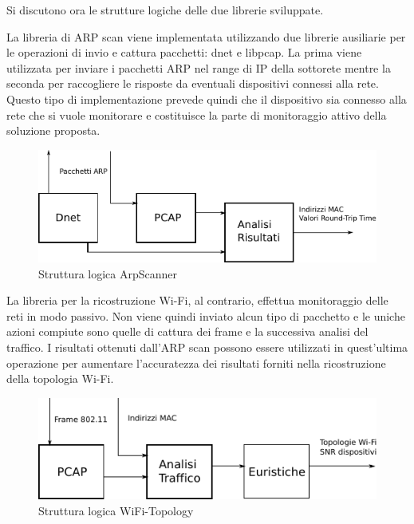 Si discutono ora le strutture logiche delle due librerie sviluppate.

La libreria di ARP scan viene implementata utilizzando due librerie ausiliarie per le operazioni di invio e cattura pacchetti: dnet e libpcap.
La prima viene utilizzata per inviare i pacchetti ARP nel range di IP della sottorete mentre la seconda per raccogliere le risposte da eventuali dispositivi connessi alla rete.
Questo tipo di implementazione prevede quindi che il dispositivo sia connesso alla rete che si vuole monitorare e costituisce la parte di monitoraggio attivo della soluzione proposta.

\begin{figure}[!htb]
	\centering
	\includegraphics{images/drawingarpscanner.pdf}%
	\caption{Struttura logica ArpScanner}
	\label{fig:ArpScanner}
\end{figure}


La libreria per la ricostruzione Wi-Fi, al contrario, effettua monitoraggio delle reti in modo passivo.
Non viene quindi inviato alcun tipo di pacchetto e le uniche azioni compiute sono quelle di cattura dei frame e la successiva analisi del traffico.
I risultati ottenuti dall'ARP scan possono essere utilizzati in quest'ultima operazione per aumentare l'accuratezza dei risultati forniti nella ricostruzione della topologia Wi-Fi.

\begin{figure}[!htb]
	\centering
	\includegraphics{images/drawingwifitopology.pdf}%
	\caption{Struttura logica WiFi-Topology}
	\label{fig:WiFi-Topology}
\end{figure}


